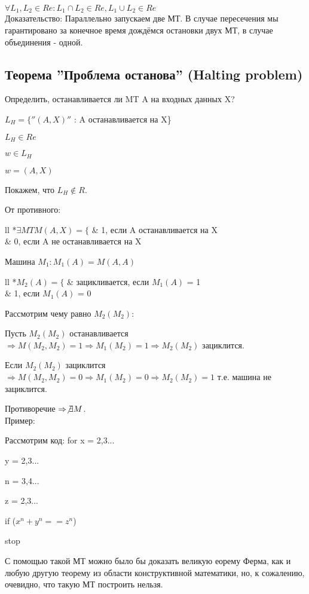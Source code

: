 \documentclass{scrartcl}
\begin{document}
$\forall L_1, L_2 \in Re : L_1 \cap L_2 \in Re, L_1 \cup L_2 \in Re$\\
Доказательство:
Параллельно запускаем две МТ. В случае пересечения мы гарантировано за конечное время дождёмся остановки двух МТ, в случае объединения - одной.

\subsection{Теорема ''Проблема останова'' (Halting problem)}
Определить, останавливается ли MT A на входных данных X?

$L_H = \{''(A, X)''$ : A останавливается на X\}

$L_H \in Re$

$w \in L_H$

$w = (A, X)$

Покажем, что $L_H \not\in R.$

От противного:

\begin{tabular}{ll}
*{$\exists MT M(A, X) = \{$} & 1, если A останавливается на X\\
& 0, если A не останавливается на X\\ 
\end{tabular}

Машина $M_1 : M_1(A) = M(A, A)$

\begin{tabular}{ll}
*{$M_2(A) = \{$} & зацикливается, если $M_1(A)$ = 1\\
& 1, если $M_1(A)$ = 0\\ 
\end{tabular}

Рассмотрим чему равно $M_2(M_2)$:

Пусть $M_2(M_2)$ останавливается $\Rightarrow M(M_2, M_2) = 1 \Rightarrow M_1(M_2) = 1 \Rightarrow M_2(M_2)$ зациклится.

Если $M_2(M_2)$ зациклится $\Rightarrow M(M_2, M_2) = 0 \Rightarrow M_1(M_2) = 0 \Rightarrow M_2(M_2) = 1$ т.е. машина не зациклится.

Противоречие $\Rightarrow \not\exists M$.\\
Пример:

Рассмотрим код:
for x = 2,3...

\hspace*{36.5mm}y = 2,3...

\hspace*{36,5mm}n = 3,4...

\hspace*{36,5mm}z = 2,3...

\hspace*{36.5mm}if ($x^n+y^n==z^n$)

\hspace*{42.5mm}stop


С помощью такой МТ можно было бы доказать великую еорему Ферма, как и любую другую теорему из области конструктивной математики, но, к сожалению, очевидно, что такую МТ построить нельзя.
\end{document}
